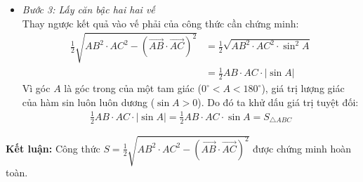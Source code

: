 \documentclass[12pt,a4paper]{article}
\begin{document}
\begin{itemize}
\begin{itemize}
\begin{itemize}
            \item \textit{Bước 3: Lấy căn bậc hai hai vế}\\
            Thay ngược kết quả vào vế phải của công thức cần chứng minh:
            \begin{align*}
                \frac{1}{2}\sqrt{AB^2 \cdot AC^2 - (\vec{AB} \cdot \vec{AC})^2} &= \frac{1}{2}\sqrt{AB^2 \cdot AC^2 \cdot \sin^2 A} \\
                &= \frac{1}{2}AB \cdot AC \cdot |\sin A|
            \end{align*}
            Vì góc $A$ là góc trong của một tam giác ($0^\circ < A < 180^\circ$), giá trị lượng giác của hàm sin luôn luôn dương ($\sin A > 0$). Do đó ta khử dấu giá trị tuyệt đối:
            \begin{align*}
                \frac{1}{2}AB \cdot AC \cdot |\sin A| = \frac{1}{2}AB \cdot AC \cdot \sin A = S_{\triangle ABC}
            \end{align*}
        \end{itemize}
        \textbf{Kết luận:} Công thức $S = \frac{1}{2}\sqrt{AB^2 \cdot AC^2 - (\vec{AB} \cdot \vec{AC})^2}$ được chứng minh hoàn toàn.
    \end{itemize}
\end{itemize}
\end{document}
